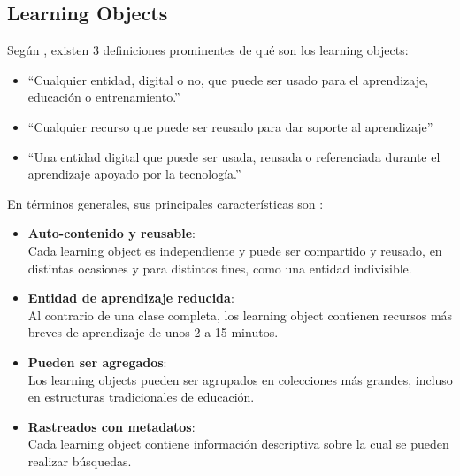 \subsection{Learning Objects}
Según \citeauthor{LearningOb_Beck2007}, existen 3 definiciones prominentes de qué son los learning objects:
\begin{itemize}
	\item ``Cualquier entidad, digital o no, que puede ser usado para el aprendizaje, educación o entrenamiento.''
	\item ``Cualquier recurso que puede ser reusado para dar soporte al aprendizaje''
	\item ``Una entidad digital que puede ser usada, reusada o referenciada durante el aprendizaje apoyado por la tecnología.'' 
\end{itemize}

En términos generales, sus principales características son \citep{LearningOb_Beck2007}:

\begin{itemize}
	\item \textbf{Auto-contenido y reusable}: \\ Cada learning object es independiente y puede ser compartido y reusado, en distintas ocasiones y para distintos fines, como una entidad indivisible.
	\item \textbf{Entidad de aprendizaje reducida}: \\ Al contrario de una clase completa, los learning object contienen recursos más breves de aprendizaje de unos 2 a 15 minutos.
	\item \textbf{Pueden ser agregados}: \\ Los learning objects pueden ser agrupados en colecciones más grandes, incluso en estructuras tradicionales de educación.
	\item \textbf{Rastreados con metadatos}: \\ Cada learning object contiene información descriptiva sobre la cual se pueden realizar búsquedas.
\end{itemize}